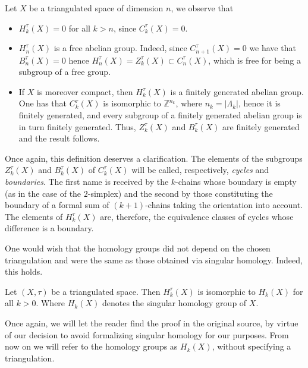 \begin{remark} Let $X$ be a triangulated space of dimension $n$, we observe that

    \begin{itemize}
        \item $H^{\tau}_k(X)=0$ for all $k>n$, since $C^{\tau}_k(X)=0$.
        \item $H^{\tau}_n(X)$ is a free abelian group. Indeed, since $C^{\tau}_{n+1}(X)=0$ we have that $B^{\tau}_n(X)=0$ hence $H^{\tau}_n(X)=Z^{\tau}_k(X)\subset C^{\tau}_n(X)$, which is free for being a subgroup of a free group. %
        \item If $X$ is moreover compact, then $H^{\tau}_k(X)$ is a finitely generated abelian group. One has that $C^{\tau}_k(X)$ is isomorphic to $\mathbb{Z}^{n_k}$, where $n_k=|\Lambda_k|$, hence it is finitely generated, and every subgroup of a finitely generated abelian group is in turn finitely generated. Thus, $Z^{\tau}_k(X)$ and $B^{\tau}_k(X)$ are finitely generated and the result follows.
    \end{itemize}
\end{remark}

Once again, this definition deserves a clarification. The elements of the subgroups $Z^{\tau}_k(X)$ and $B^{\tau}_k(X)$ of $C^{\tau}_k(X)$ will be called, respectively, \textit{cycles} and \textit{boundaries}. The first name is received by the $k$-chains whose boundary is empty (as in the case of the $2$-simplex) and the second by those constituting the boundary of a formal sum of $(k+1)$-chains taking the orientation into account. The elements of $H^{\tau}_k(X)$ are, therefore, the equivalence classes of cycles whose difference is a boundary.

One would wish that the homology groups did not depend on the chosen triangulation and were the same as those obtained via singular homology. Indeed, this holds.

\begin{theorem}
    Let $(X,\tau)$ be a triangulated space. Then $H^{\tau}_k(X)$ is isomorphic to $H_k(X)$ for all $k>0$. Where $H_k(X)$ denotes the singular homology group of $X$. %
\end{theorem}

Once again, we will let the reader find the proof in the original source, by virtue of our decision to avoid formalizing singular homology for our purposes. From now on we will refer to the homology groups as $H_k(X)$, without specifying a triangulation.

